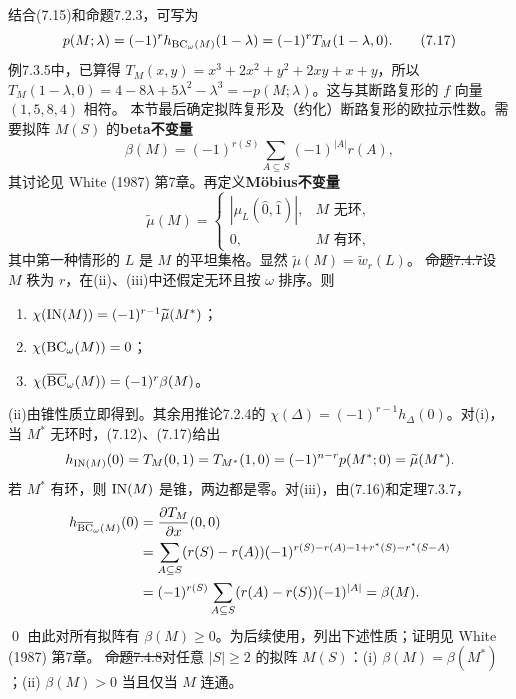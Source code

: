 结合(7.15)和命题7.2.3，可写为
\[p(M;\lambda)=(-1)^rh_{\operatorname{BC}_\omega(M)}(1-\lambda)=(-1)^rT_M(1-\lambda,0).\tag{7.17}\]
例7.3.5中，已算得 $T_M(x,y)=x^3+2x^2+y^2+2xy+x+y$，所以 $T_M(1-\lambda,0)=4-8\lambda+5\lambda^2-\lambda^3=-p(M;\lambda)$。这与其断路复形的 $f$ 向量 $(1,5,8,4)$ 相符。
本节最后确定拟阵复形及（约化）断路复形的欧拉示性数。需要拟阵 $M(S)$ 的\textbf{beta不变量}
\[\beta(M)=(-1)^{r(S)}\sum_{A\subseteq S}(-1)^{|A|}r(A),\tag{7.18}\]
其讨论见 White (1987) 第7章。再定义\textbf{Möbius不变量}
\[\widetilde\mu(M)=\begin{cases}|\mu_L(\hat0,\hat1)|,&M\text{ 无环},\\0,&M\text{ 有环},\end{cases}\tag{7.19}\]
其中第一种情形的 $L$ 是 $M$ 的平坦集格。显然 $\widetilde\mu(M)=\widetilde w_r(L)$。
\st{命题7.4.7}设 $M$ 秩为 $r$，在(ii)、(iii)中还假定无环且按 $\omega$ 排序。则
\begin{enumerate}[label=(\roman*)]
\item $\chi(\operatorname{IN}(M))=(-1)^{r-1}\widetilde\mu(M^*)$；
\item $\chi(\operatorname{BC}_\omega(M))=0$；
\item $\chi(\overline{\operatorname{BC}}_\omega(M))=(-1)^r\beta(M)$。
\end{enumerate}
\pr (ii)由锥性质立即得到。其余用推论7.2.4的 $\chi(\Delta)=(-1)^{r-1}h_\Delta(0)$。对(i)，当 $M^*$ 无环时，(7.12)、(7.17)给出
\[h_{\operatorname{IN}(M)}(0)=T_M(0,1)=T_{M^*}(1,0)=(-1)^{n-r}p(M^*;0)=\widetilde\mu(M^*).\]
若 $M^*$ 有环，则 $\operatorname{IN}(M)$ 是锥，两边都是零。对(iii)，由(7.16)和定理7.3.7，
\[\begin{aligned}
h_{\overline{\operatorname{BC}}_\omega(M)}(0)&=\frac{\partial T_M}{\partial x}(0,0)\\
&=\sum_{A\subseteq S}(r(S)-r(A))(-1)^{r(S)-r(A)-1+r^*(S)-r^*(S-A)}\\
&=(-1)^{r(S)}\sum_{A\subseteq S}(r(A)-r(S))(-1)^{|A|}=\beta(M).
\end{aligned}\]\qed
由此对所有拟阵有 $\beta(M)\ge0$。为后续使用，列出下述性质；证明见 White (1987) 第7章。
\st{命题7.4.8}对任意 $|S|\ge2$ 的拟阵 $M(S)$：(i) $\beta(M)=\beta(M^*)$；(ii) $\beta(M)>0$ 当且仅当 $M$ 连通。
